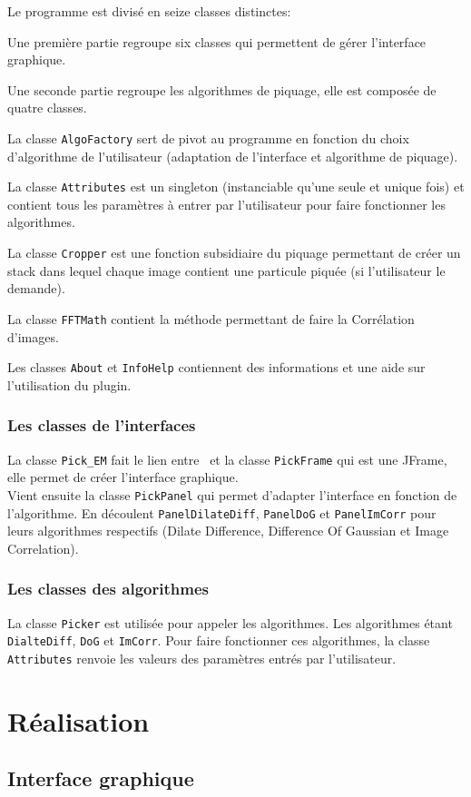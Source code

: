 \documentclass[12pt,a4paper]{report}
\begin{document}
Le programme est divisé en seize classes distinctes:
\begin{list}{•}
\item Une première partie regroupe six classes qui permettent de gérer l'interface graphique.
\item
\item Une seconde partie regroupe les algorithmes de piquage, elle est composée de quatre classes.
\item La classe \texttt{AlgoFactory} sert de pivot au programme en fonction du choix d'algorithme de l'utilisateur (adaptation de l'interface et algorithme de piquage).
\item La classe \texttt{Attributes} est un singleton (instanciable qu'une seule et unique fois) et contient tous les paramètres à entrer par l'utilisateur pour faire fonctionner les algorithmes.
\item La classe \texttt{Cropper} est une fonction subsidiaire du piquage permettant de créer un stack dans lequel chaque image contient une particule piquée (si l'utilisateur le demande).
\item La classe \texttt{FFTMath} contient la méthode permettant de faire la Corrélation d'images.
\item Les classes \texttt{About} et \texttt{InfoHelp} contiennent des informations et une aide sur l'utilisation du plugin.
\end{list}

\subsection{Les classes de l'interfaces}

La classe \texttt{Pick\_EM} fait le lien entre \imj ~et la classe \texttt{PickFrame} qui est une JFrame, elle permet de créer l'interface graphique.\\
Vient ensuite la classe \texttt{PickPanel} qui permet d'adapter l'interface en fonction de l'algorithme. En découlent \texttt{PanelDilateDiff}, \texttt{PanelDoG} et \texttt{PanelImCorr} pour leurs algorithmes respectifs (Dilate Difference, Difference Of Gaussian et Image Correlation).

\subsection{Les classes des algorithmes}

La classe \texttt{Picker} est utilisée pour appeler les algorithmes. Les algorithmes étant \texttt{DialteDiff}, \texttt{DoG} et \texttt{ImCorr}.
Pour faire fonctionner ces algorithmes, la classe \texttt{Attributes} renvoie les valeurs des paramètres entrés par l'utilisateur.

\chapter{Réalisation}

\section{Interface graphique}
\end{document}
